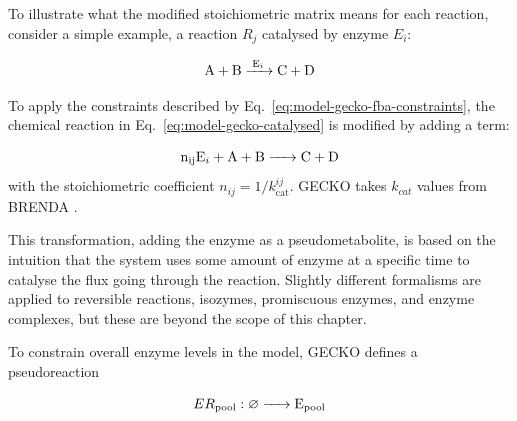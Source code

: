 
To illustrate what the modified stoichiometric matrix means for each reaction, consider a simple example, a reaction $R_{j}$ catalysed by enzyme $E_{i}$:

\begin{equation}
  \ce{ A + B ->[E_{i}] C + D }
  \label{eq:model-gecko-catalysed}
\end{equation}

To apply the constraints described by Eq.\ \ref{eq:model-gecko-fba-constraints}, the chemical reaction in Eq.\ \ref{eq:model-gecko-catalysed} is modified by adding a term:

\begin{equation}
  \ce{ n_{ij}E_{i} + A + B -> C + D }
  \label{eq:model-gecko-catalysed-formalism}
\end{equation}
with the stoichiometric coefficient $n_{ij} = 1/k_{\mathrm{cat}}^{ij}$.
GECKO takes $k_{cat}$ values from BRENDA \parencite{changBRENDAELIXIRCore2021}.

This transformation, adding the enzyme as a pseudometabolite, is based on the intuition that the system uses some amount of enzyme at a specific time to catalyse the flux going through the reaction.
%
Slightly different formalisms are applied to reversible reactions, isozymes, promiscuous enzymes, and enzyme complexes, but these are beyond the scope of this chapter.

To constrain overall enzyme levels in the model, GECKO defines a pseudoreaction

\begin{equation}
  ER_{\mathrm{pool}}: \varnothing \ce{ -> E_{pool} }
  \label{eq:model-gecko-enzyme-pool}
\end{equation}

